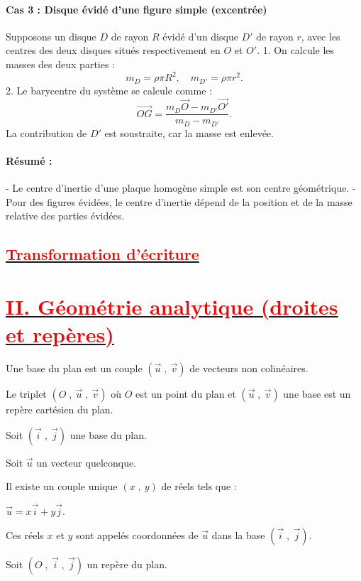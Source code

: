 \documentclass{article}
\begin{document}
\paragraph{Cas 3 : Disque évidé d’une figure simple (excentrée)}  
Supposons un disque \( D \) de rayon \( R \) évidé d’un disque \( D' \) de rayon \( r \), avec les centres des deux disques situés respectivement en \( O \) et \( O' \).  
1. On calcule les masses des deux parties :  
   \[
   m_D = \rho \pi R^2, \quad m_{D'} = \rho \pi r^2.
   \]
2. Le barycentre du système se calcule comme :  
   \[
   \overrightarrow{OG} = \frac{m_D \overrightarrow{O} - m_{D'} \overrightarrow{O'}}{m_D - m_{D'}}.
   \]
   La contribution de \( D' \) est soustraite, car la masse est enlevée.

\paragraph{Résumé :}  
- Le centre d’inertie d’une plaque homogène simple est son centre géométrique.  
- Pour des figures évidées, le centre d’inertie dépend de la position et de la masse relative des parties évidées.

\subsection*{\underline{\textbf{\textcolor{red}{Transformation d'écriture}}}}
\section*{\underline{\textbf{\textcolor{red}{II. Géométrie analytique (droites et repères)}}}}
		Une base du plan est un couple $(\vec{u}\;,\ \vec{v})$ de vecteurs non colinéaires.
		
		Le triplet $(O\;,\ \vec{u}\;,\ \vec{v})$ où $O$ est un point du plan et $(\vec{u}\;,\ \vec{v})$ une base est un repère cartésien du plan.
		
		Soit $(\vec{i}\;,\ \vec{j})$ une base du plan.
		
		Soit $\vec{u}$ un vecteur quelconque.
		
		Il existe un couple unique $(x\;,\ y)$ de réels tels que :
		
		$\vec{u}=x\vec{i}+y\vec{j}.$
		
		Ces réels $x$ et $y$ sont appelés coordonnées de $\vec{u}$ dans la base $(\vec{i}\;,\ \vec{j}).$
		
		Soit $(O\;,\ \vec{i}\;,\ \vec{j})$ un repère du plan.
		
\end{document}
